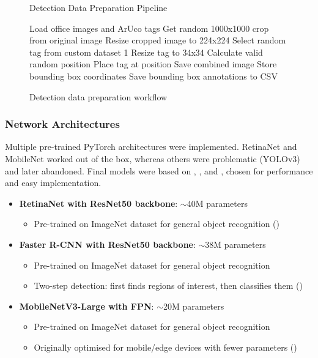 \documentclass[conference]{IEEEtran}
\begin{document}
\begin{figure}[H]
\begin{algorithm}[H]
\caption{Detection Data Preparation Pipeline}
\begin{algorithmic}[1]
\STATE Load office images and ArUco tags
    \STATE Get random 1000x1000 crop from original image
    \STATE Resize cropped image to 224x224
        \STATE Select random tag from custom dataset 1
        \STATE Resize tag to 34x34
        \STATE Calculate valid random position
        \STATE Place tag at position
        \STATE Save combined image
        \STATE Store bounding box coordinates
    \ENDFOR
\ENDFOR
\STATE Save bounding box annotations to CSV
\end{algorithmic}
\end{algorithm}
\caption{Detection data preparation workflow}
\end{figure}

\subsubsection{Network Architectures}

Multiple pre-trained PyTorch architectures were implemented. RetinaNet and MobileNet worked out of the box, whereas others were
problematic (YOLOv3) and later abandoned. Final models were based on \textcite{pytorch_retinanet}, \textcite{pytorch_fasterrcnn},
and \textcite{pytorch_mobilenet_rcnn}, chosen for performance and easy implementation.

\begin{itemize}
    \item \textbf{RetinaNet with ResNet50 backbone}: $\sim$40M parameters
    \begin{itemize}
        \item Pre-trained on ImageNet dataset for general object recognition (\cite{pytorch_retinanet})
    \end{itemize}
    
    \item \textbf{Faster R-CNN with ResNet50 backbone}: $\sim$38M parameters
    \begin{itemize}
        \item Pre-trained on ImageNet dataset for general object recognition
        \item Two-step detection: first finds regions of interest, then classifies them (\cite{pytorch_fasterrcnn})
    \end{itemize}
    
    \item \textbf{MobileNetV3-Large with FPN}: $\sim$20M parameters
    \begin{itemize}
        \item Pre-trained on ImageNet dataset for general object recognition
        \item Originally optimised for mobile/edge devices with fewer parameters (\cite{pytorch_mobilenet_rcnn})
    \end{itemize}
\end{itemize}
\end{document}
